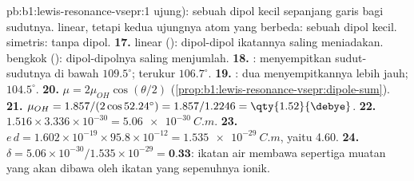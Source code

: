 \begin{solution}{pb:b1:lewis-resonance-vsepr:1}
ujung): sebuah dipol kecil sepanjang garis bagi sudutnya. 
linear, tetapi kedua ujungnya atom yang berbeda: sebuah dipol kecil.
 simetris: tanpa dipol.
\textbf{17.}  linear (): dipol-dipol ikatannya saling
meniadakan.  bengkok (): dipol-dipolnya saling
menjumlah.
\textbf{18.} :  menyempitkan sudut-sudutnya di
bawah $109.5^\circ$; terukur $106.7^\circ$.
\textbf{19.} : dua  menyempitkannya lebih jauh;
$104.5^\circ$.
\textbf{20.} $\mu = 2\mu_{OH}\cos(\theta/2)$
(\cref{prop:b1:lewis-resonance-vsepr:dipole-sum}).
\textbf{21.} $\mu_{OH} = 1.857/(2\cos 52.24^\circ) = 1.857/1.2246 =
\qty{1.52}{\debye}$.
\textbf{22.} $1.516 \times 3.336 \times 10^{-30} = \qty{5.06e-30}{C.m}$.
\textbf{23.} $e\,d = 1.602 \times 10^{-19} \times 95.8 \times 10^{-12} =
\qty{1.535e-29}{C.m}$, yaitu \qty{4.60}{\debye}.
\textbf{24.} $\delta = 5.06 \times 10^{-30}/1.535 \times 10^{-29} =
\textbf{0.33}$: ikatan  air membawa sepertiga muatan yang akan
dibawa oleh ikatan yang sepenuhnya ionik.
\end{solution}
